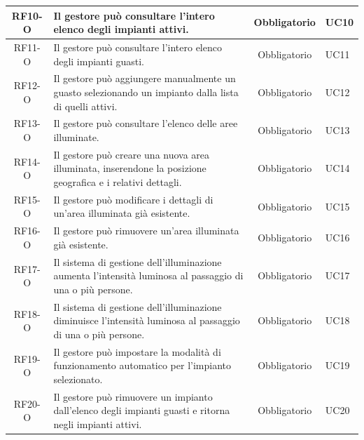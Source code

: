 \documentclass[a4paper, 12pt]{article}
\begin{document}
\begin{longtable}{|c|p{7cm}|c|p{4cm}|}
    RF10-O & Il gestore può consultare l'intero elenco degli impianti attivi. & Obbligatorio & UC10 \\
    \hline
    RF11-O & Il gestore può consultare l'intero elenco degli impianti guasti. & Obbligatorio & UC11 \\
    \hline
    RF12-O & Il gestore può aggiungere manualmente un guasto selezionando un
    impianto dalla lista di quelli attivi. & Obbligatorio & UC12 \\
    \hline
    RF13-O & Il gestore può consultare l'elenco delle aree illuminate. & Obbligatorio & UC13 \\
    \hline
    RF14-O & Il gestore può creare una nuova area illuminata, inserendone la
    posizione geografica e i relativi dettagli. & Obbligatorio & UC14 \\
    \hline
    RF15-O & Il gestore può modificare i dettagli di un'area illuminata già esistente. & Obbligatorio & UC15 \\
    \hline
    RF16-O & Il gestore può rimuovere un'area illuminata già esistente. &
    Obbligatorio & UC16 \\
    \hline
    RF17-O & Il sistema di gestione dell'illuminazione aumenta l'intensità
    luminosa al passaggio di una o più persone. & Obbligatorio & UC17 \\
    \hline
    RF18-O & Il sistema di gestione dell'illuminazione diminuisce l'intensità
    luminosa al passaggio di una o più persone. & Obbligatorio & UC18 \\
    \hline
    RF19-O & Il gestore può impostare la modalità di funzionamento automatico
    per l'impianto selezionato. & Obbligatorio & UC19 \\
    \hline
    RF20-O & Il gestore può rimuovere un impianto dall'elenco degli impianti
    guasti e ritorna negli impianti attivi. & Obbligatorio & UC20 \\
    \bottomrule
\end{longtable}
\end{document}
